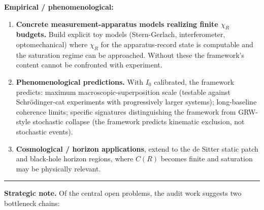 \documentclass[11pt,a4paper]{article}
\begin{document}
\textbf{Empirical / phenomenological:}

\begin{enumerate}
  \item \textbf{Concrete measurement-apparatus models realizing finite $\chi_R$ budgets.} Build explicit toy models (Stern-Gerlach, interferometer, optomechanical) where $\chi_R$ for the apparatus-record state is computable and the saturation regime can be approached. Without these the framework's content cannot be confronted with experiment.
  \item \textbf{Phenomenological predictions.} With $I_0$ calibrated, the framework predicts: maximum macroscopic-superposition scale (testable against Schrödinger-cat experiments with progressively larger systems); long-baseline coherence limits; specific signatures distinguishing the framework from GRW-style stochastic collapse (the framework predicts kinematic exclusion, not stochastic events).
  \item \textbf{Cosmological / horizon applications}, extend to the de Sitter static patch and black-hole horizon regions, where $C(R)$ becomes finite and saturation may be physically relevant.
\end{enumerate}

\medskip\hrule\medskip

\textbf{Strategic note.} Of the central open problems, the audit work suggests two bottleneck chains:
\end{document}

